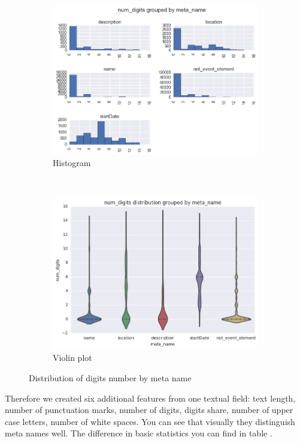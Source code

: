 \begin{figure}[h]
\begin{subfigure}{1\textwidth}
  \centering
  \includegraphics[width=1.0\textwidth]{figures07/distrDigitsByMeta}
  \caption{Histogram}
\end{subfigure} \\
\begin{subfigure}{1\textwidth}
  \centering
  \includegraphics[width=1.0\textwidth]{figures07/distrDigitsByMeta_violin}
  \caption{Violin plot}
\end{subfigure}
\caption{Distribution of digits number by meta name}
\label{fig:distrDigitsByMeta}
\end{figure}

Therefore we created six additional features from one textual field: text length, number of punctuation marks, number of digits, digits share, number of upper case letters, number of white spaces. You can see that visually they distinguish meta names well. The difference in basic statistics you can find in table . \\

